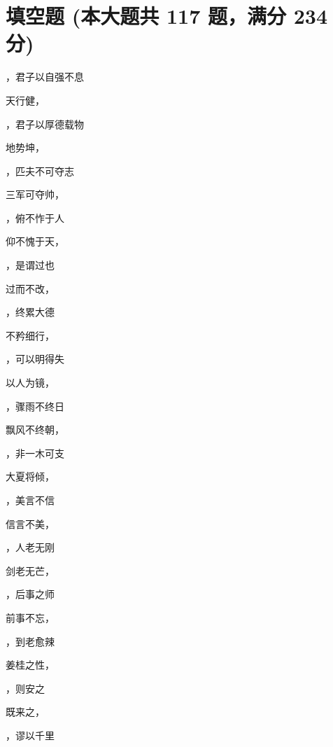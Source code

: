 \documentclass[12pt, a4paper, addpoints, answers]{exam}
\begin{document}
\hspace{5cm}

\section{\normalsize{填空题 (本大题共 117 题，满分 234 分)}}
\hspace{1.5cm}
\begin{multicols}{2}
\begin{questions}
\question[2] \fillin ，君子以自强不息

\question[2] 天行健，\fillin 

\question[2] \fillin ，君子以厚德载物

\question[2] 地势坤，\fillin 

\question[2] \fillin ，匹夫不可夺志

\question[2] 三军可夺帅，\fillin 

\question[2] \fillin ，俯不怍于人

\question[2] 仰不愧于天，\fillin 

\question[2] \fillin ，是谓过也

\question[2] 过而不改，\fillin 

\question[2] \fillin ，终累大德

\question[2] 不矜细行，\fillin 

\question[2] \fillin ，可以明得失

\question[2] 以人为镜，\fillin 

\question[2] \fillin ，骤雨不终日

\question[2] 飘风不终朝，\fillin 

\question[2] \fillin ，非一木可支

\question[2] 大夏将倾，\fillin 

\question[2] \fillin ，美言不信

\question[2] 信言不美，\fillin 

\question[2] \fillin ，人老无刚

\question[2] 剑老无芒，\fillin 

\question[2] \fillin ，后事之师

\question[2] 前事不忘，\fillin 

\question[2] \fillin ，到老愈辣

\question[2] 姜桂之性，\fillin 

\question[2] \fillin ，则安之

\question[2] 既来之，\fillin 

\question[2] \fillin ，谬以千里


\end{questions}
\end{multicols}
\end{document}
